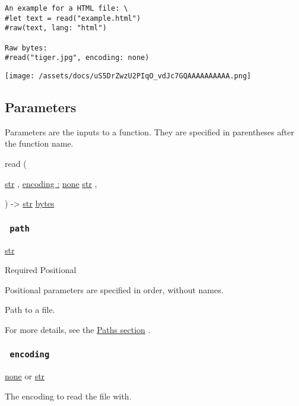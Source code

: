 \begin{verbatim}
An example for a HTML file: \
#let text = read("example.html")
#raw(text, lang: "html")

Raw bytes:
#read("tiger.jpg", encoding: none)
\end{verbatim}

\texttt{[image: /assets/docs/uS5DrZwzU2PIqO\_vdJc7GQAAAAAAAAAA.png]}

\subsection{\texorpdfstring{{ Parameters
}}{ Parameters }}\label{parameters}

\label{parameters-tooltip}
Parameters are the inputs to a function. They are specified in
parentheses after the function name.

{ read } (

{ \href{/docs/reference/foundations/str/}{str} , } {
\hyperref[parameters-encoding]{encoding :}
\href{/docs/reference/foundations/none/}{none}
\href{/docs/reference/foundations/str/}{str} , }

) -\textgreater{} \href{/docs/reference/foundations/str/}{str}
\href{/docs/reference/foundations/bytes/}{bytes}

\subsubsection{\texorpdfstring{\texttt{\ path\ }}{ path }}\label{parameters-path}

\href{/docs/reference/foundations/str/}{str}

{Required} {{ Positional }}

\label{parameters-path-positional-tooltip}
Positional parameters are specified in order, without names.

Path to a file.

For more details, see the \href{/docs/reference/syntax/\#paths}{Paths
section} .

\subsubsection{\texorpdfstring{\texttt{\ encoding\ }}{ encoding }}\label{parameters-encoding}

\href{/docs/reference/foundations/none/}{none} {or}
\href{/docs/reference/foundations/str/}{str}

The encoding to read the file with.

